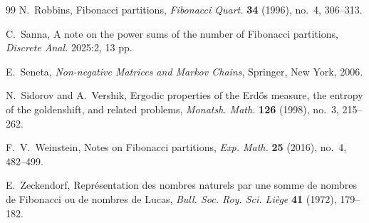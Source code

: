 \begin{thebibliography}{99}
N.~Robbins,
Fibonacci partitions,
\textit{Fibonacci Quart.} \textbf{34} (1996), no.~4, 306--313.

C.~Sanna,
A note on the power sums of the number of Fibonacci partitions,
\textit{Discrete Anal.} 2025:2, 13 pp.

E.~Seneta,
\textit{Non-negative Matrices and Markov Chains},
Springer, New York, 2006.

N.~Sidorov and A.~Vershik,
Ergodic properties of the Erd\H{o}s measure, the entropy of the goldenshift,
and related problems,
\textit{Monatsh. Math.} \textbf{126} (1998), no.~3, 215--262.

F.~V.~Weinstein,
Notes on Fibonacci partitions,
\textit{Exp. Math.} \textbf{25} (2016), no.~4, 482--499.

E.~Zeckendorf,
Repr\'esentation des nombres naturels par une somme de nombres de Fibonacci ou
de nombres de Lucas,
\textit{Bull. Soc. Roy. Sci. Li\`ege} \textbf{41} (1972), 179--182.

\end{thebibliography}
